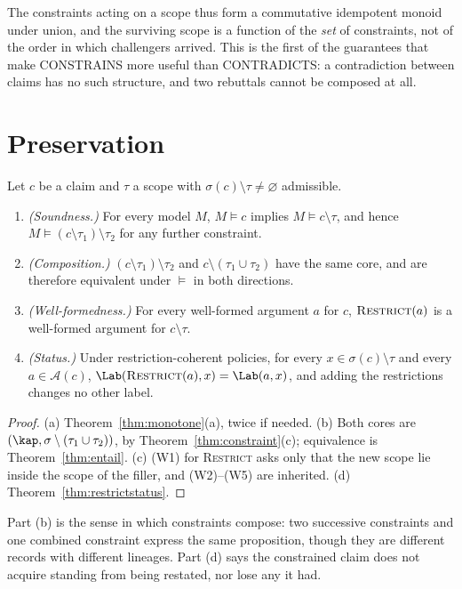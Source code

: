 The constraints acting on a scope thus form a commutative idempotent monoid under union, and the surviving scope is a function of the \emph{set} of constraints, not of the order in which challengers arrived. This is the first of the guarantees that make CONSTRAINS more useful than CONTRADICTS: a contradiction between claims has no such structure, and two rebuttals cannot be composed at all.

\section{Preservation}

\begin{theorem}\label{thm:preserve}
Let $c$ be a claim and $\tau$ a scope with $\sigma(c)\setminus\tau\neq\varnothing$ admissible.
\begin{enumerate}[label=(\alph*)]
\item \emph{(Soundness.)} For every model $M$, $M\models c$ implies $M\models c\setminus\tau$, and hence $M\models(c\setminus\tau_1)\setminus\tau_2$ for any further constraint.
\item \emph{(Composition.)} $(c\setminus\tau_1)\setminus\tau_2$ and $c\setminus(\tau_1\cup\tau_2)$ have the same core, and are therefore equivalent under $\models$ in both directions.
\item \emph{(Well-formedness.)} For every well-formed argument $a$ for $c$, $\textsc{Restrict}(a)$ is a well-formed argument for $c\setminus\tau$.
\item \emph{(Status.)} Under restriction-coherent policies, for every $x\in\sigma(c)\setminus\tau$ and every $a\in\mathcal A(c)$, $\Lab(\textsc{Restrict}(a),x)=\Lab(a,x)$, and adding the restrictions changes no other label.
\end{enumerate}
\end{theorem}

\begin{proof}
(a) Theorem~\ref{thm:monotone}(a), twice if needed. (b) Both cores are $(\kap,\sigma\setminus(\tau_1\cup\tau_2))$, by Theorem~\ref{thm:constraint}(c); equivalence is Theorem~\ref{thm:entail}. (c) (W1) for \textsc{Restrict} asks only that the new scope lie inside the scope of the filler, and (W2)--(W5) are inherited. (d) Theorem~\ref{thm:restrictstatus}.
\end{proof}

Part (b) is the sense in which constraints compose: two successive constraints and one combined constraint express the same proposition, though they are different records with different lineages. Part (d) says the constrained claim does not acquire standing from being restated, nor lose any it had.

